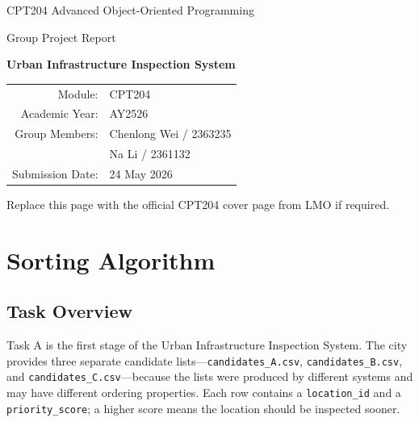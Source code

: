 \documentclass[12pt,a4paper,twocolumn,openany]{report}
\begin{document}
\sloppy

\begin{titlepage}
    \centering
    \vspace*{1.2cm}
    {\Large CPT204 Advanced Object-Oriented Programming\par}
    \vspace{0.5cm}
    {\Large Group Project Report\par}
    \vspace{1.0cm}
    {\Huge\bfseries Urban Infrastructure Inspection System\par}
    \vspace{1.2cm}

    \begin{tabular}{rl}
        Module: & CPT204 \\
        Academic Year: & AY2526 \\
        Group Members: & Chenlong Wei / 2363235 \\
                       & Na Li / 2361132 \\
        Submission Date: & 24 May 2026 \\
    \end{tabular}

    \vfill
    {\small Replace this page with the official CPT204 cover page from LMO if required.}
\end{titlepage}

\tableofcontents
\vspace{0.35\baselineskip}

\chapter{Sorting Algorithm}

\section{Task Overview}
Task A is the first stage of the Urban Infrastructure Inspection System. 
The city provides three separate candidate lists---\texttt{candidates\_A.csv}, \texttt{candidates\_B.csv}, and \texttt{candidates\_C.csv}---because the lists were produced by different systems and may have different ordering properties. 
Each row contains a \texttt{location\_id} and a \texttt{priority\_score}; a higher score means the location should be inspected sooner.
\end{document}
